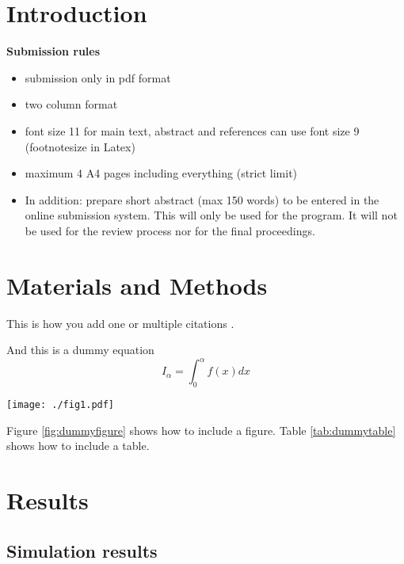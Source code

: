 \section{Introduction}

\textbf{\color{red}Submission rules}
\begin{itemize}
\color{red}
\item submission only in pdf format
\item two column format
\item font size 11 for main text, abstract and references can use font size 9 (footnotesize in Latex)
\item maximum 4 A4 pages including everything (strict limit)
\item In addition: prepare short abstract (max 150 words) to be entered in the online submission system. 
      This will only be used for the program. 
      It will not be used for the review process nor for the final proceedings.
\end{itemize}

\lipsum[2-5]


\section{Materials and Methods}

This is how you add one \cite{Liu2018} or multiple citations \cite{Baete2004,Vunckx2012,Burgos2014}.

And this is a dummy equation
\begin{equation}
I_\alpha = \int_0^\alpha f(x) dx
\end{equation}

\begin{figure*}
  \centering
  \texttt{[image: ./fig1.pdf]}
  \caption{This a dummy figure to be replaced.}
  \label{fig:dummyfigure}
\end{figure*}

Figure \ref{fig:dummyfigure} shows how to include a figure.
Table \ref{tab:dummytable} shows how to include a table.

\bigskip

\lipsum[2-7]

\section{Results}
\subsection{Simulation results}

